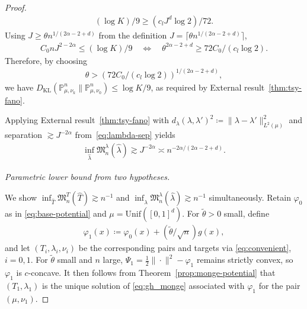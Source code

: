 \documentclass[11pt,reqno]{amsart}
\theoremstyle{definition}
\newcommand{\KL}{\mathrm{KL}}
\renewcommand{\hat}{\widehat}
\renewcommand{\tilde}{\widetilde}
\begin{document}
\begin{proof}
\begin{align}
    (\log K)/9 \ge (c_l J^d\log 2)/72.
\end{align}
Using $J\ge\theta n^{1/(2\alpha-2+d)}$ from the definition $J=\lceil\theta n^{1/(2\alpha-2+d)}\rceil$,
\begin{align}
    C_0 n J^{2-2\alpha} \le (\log K)/9
    \quad\Longleftrightarrow\quad
    \theta^{2\alpha-2+d} \ge 72 C_0/(c_l\log 2).
\end{align}
Therefore, by choosing
\begin{align}
    \theta  >  \left(72 C_0/(c_l\log 2)\right)^{ 1/(2\alpha-2+d)},
\end{align}
we have $D_\KL(\mathbb P_{\mu,\nu_k}^n\|\mathbb P_{\mu,\nu_0}^n)\le\log K/9$, as required by External result~\ref{thm:tsy-fano}.

Applying External result~\ref{thm:tsy-fano} with $d_\lambda(\lambda,\lambda')^2\coloneqq\|\lambda-\lambda'\|_{L^2(\mu)}^2$ and separation $\gtrsim J^{-2\alpha}$ from~\eqref{eq:lambda-sep} yields
\begin{align}
    \label{eq:lb-lambda-nonpar}
    \inf_{\hat\lambda} \mathfrak M_n^\lambda(\hat\lambda)  \gtrsim  J^{-2\alpha}  \asymp  n^{-2\alpha/(2\alpha-2+d)}.
\end{align}

\smallskip
\noindent\emph{Parametric lower bound from two hypotheses.}

We show $\inf_{\hat T}\mathfrak M_n^T(\hat T)\gtrsim n^{-1}$ and $\inf_{\hat\lambda}\mathfrak M_n^\lambda(\hat\lambda)\gtrsim n^{-1}$ simultaneously. Retain $\varphi_0$ as in \eqref{eq:base-potential} and $\mu=\mathrm{Unif}([0,1]^d)$. For $\tilde\theta>0$ small, define
\begin{align}
    \varphi_1(x)\coloneqq \varphi_0(x)+(\tilde\theta/\sqrt n) g(x),
\end{align}
and let $(T_i,\lambda_i,\nu_i)$ be the corresponding pairs and targets via \eqref{eq:convenient}, $i=0,1$. For $\tilde\theta$ small and $n$ large, $\Psi_1=\frac1{2}\|\cdot\|^2-\varphi_1$ remains strictly convex, so $\varphi_1$ is $c$-concave. It then follows from Theorem~\ref{prop:monge-potential} that $(T_1,\lambda_1)$ is the unique solution of \eqref{eq:gh_monge} associated with $\varphi_1$ for the pair $(\mu,\nu_1)$.


\end{proof}
\end{document}
